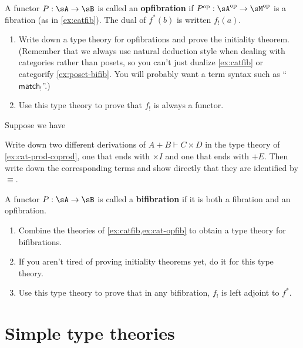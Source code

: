 \documentclass{book}
\let\types\vdash
\def\timesI{\ensuremath{\mathord{\times}I}}
\def\plusE{\mathord{+}E}
\def\match{\mathsf{match}}
\begin{document}
\begin{ex}\label{ex:cat-opfib}
  A functor $P:\sA\to\sB$ is called an \textbf{opfibration} if $P\op:\sA\op\to\sM\op$ is a fibration (as in \cref{ex:catfib}).
  The dual of $f^*(b)$ is written $f_!(a)$.
  \begin{enumerate}
  \item Write down a type theory for opfibrations and prove the initiality theorem.
    (Remember that we always use natural deduction style when dealing with categories rather than posets, so you can't just dualize \cref{ex:catfib} or categorify \cref{ex:poset-bifib}.
    You will probably want a term syntax such as ``$\match_!$''.)
  \item Use this type theory to prove that $f_!$ is always a functor.
  \end{enumerate}
\end{ex}

\begin{ex}\label{ex:cat-prod-coprod-uniq}
  Suppose we have
  Write down two different derivations of $A+B\types C\times D$ in the type theory of \cref{ex:cat-prod-coprod}, one that ends with $\timesI$ and one that ends with $\plusE$.
  Then write down the corresponding terms and show directly that they are identified by $\equiv$.
\end{ex}

\begin{ex}\label{ex:cat-bifib}
  A functor $P:\sA\to\sB$ is called a \textbf{bifibration} if it is both a fibration and an opfibration.
  \begin{enumerate}
  \item Combine the theories of \cref{ex:catfib,ex:cat-opfib} to obtain a type theory for bifibrations.
  \item If you aren't tired of proving initiality theorems yet, do it for this type theory.
  \item Use this type theory to prove that in any bifibration, $f_!$ is left adjoint to $f^*$.
  \end{enumerate}
\end{ex}



\chapter{Simple type theories}
\label{chap:simple}
\end{document}
